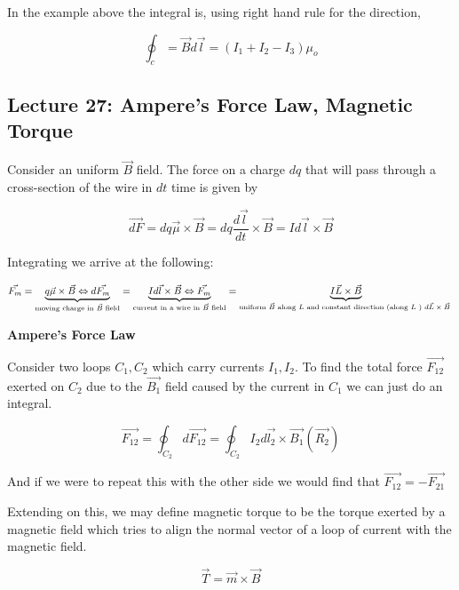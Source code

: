 \documentclass[10pt]{article}
\begin{document}
In the example above the integral is, using right hand rule for the direction, 

\begin{equation*}
	\oint_c = \vec{B} d \vec{l} = (I_1 + I_2 - I_3)\mu_o
\end{equation*}

\subsection{Lecture 27: Ampere's Force Law, Magnetic Torque}

Consider an uniform $\vec{B} $ field. 
The force on a charge $ dq $ that will pass through a cross-section of the wire in $ dt $ time is given by 

\begin{equation}
\vec{dF} = dq\vec{\mu} \times \vec{B} = dq \frac{d\vec{l}}{dt} \times \vec{B} = I d\vec{l} \times\vec{B}
\end{equation}

Integrating we arrive at the following:


\begin{equation}
	\vec{F_m} =
	\underbrace{q\vec{\mu} \times \vec{B} \Leftrightarrow d\vec{F_m}}_{\text{moving charge in }\vec{B} \text{ field}} =
	\underbrace{I d\vec{l} \times  \vec{B} \Leftrightarrow \vec{F_m}}_{\text{current in a wire in }\vec{B} \text{ field}} =
	\underbrace{I\vec{L}  \times\vec{B}}_{\text{uniform }\vec{B} \text{ along } L \text{ and constant direction (along $ L $ ) $d\vec{L} \times \vec{B} $  }}
\end{equation}

\begin{definition}
	\textbf{Ampere's Force Law} 

	Consider two loops $ C_1, C_2 $ which carry currents $ I_1, I_2 $.
	To find the total force $ \vec{F_{12}} $ exerted on $ C_2 $ due to the $ \vec{B_1} $ field caused by the current in $ C_1 $ we can just do an integral.

	\begin{equation}
		\vec{F_{12}} = \oint_{C_2} d\vec{F_{12}} = \oint_{C_2} I_2 d\vec{l_2}  \times \vec{B_1} (\vec{R_2}) 
		\label{eq:259:amperes_force_law}
	\end{equation}

	And if we were to repeat this with the other side we would find that $\vec{F_{12}} = - \vec{F_{21}} $ 

	Extending on this, we may define magnetic torque to be the torque exerted by a magnetic field which tries to align the normal vector of a loop of current with the magnetic field.

	\begin{equation}
	\vec{T} =\vec{m} \times \vec{B}
	\label{eq:259:magnetic_torque}
	\end{equation}

	
\end{definition}
\end{document}
